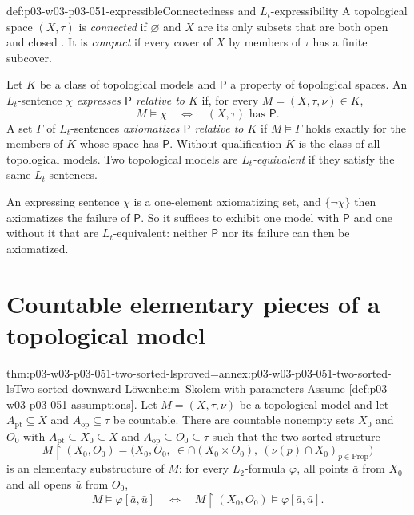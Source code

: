 \begin{hbdefinition}{def:p03-w03-p03-051-expressible}{Connectedness and \(L_t\)-expressibility}
A topological space \((X,\tau)\) is \emph{connected} if \(\varnothing\) and
\(X\) are its only subsets that are both open and closed
\cite[Definition~13, p.~11]{TenCateGabelaiaSustretov2006TopologyDraft}.
It is \emph{compact} if every cover of \(X\) by members of \(\tau\) has a
finite subcover.

Let \(K\) be a class of topological models and \(\mathsf P\) a property of
topological spaces. An \(L_t\)-sentence \(\chi\) \emph{expresses
\(\mathsf P\) relative to \(K\)} if, for every \(M=(X,\tau,\nu)\in K\),
\[
 M\models\chi\quad\Longleftrightarrow\quad(X,\tau)\text{ has }\mathsf P.
\]
A set \(\Gamma\) of \(L_t\)-sentences \emph{axiomatizes \(\mathsf P\)
relative to \(K\)} if \(M\models\Gamma\) holds exactly for the members of
\(K\) whose space has \(\mathsf P\). Without qualification \(K\) is the
class of all topological models. Two topological models are
\emph{\(L_t\)-equivalent} if they satisfy the same \(L_t\)-sentences.
\end{hbdefinition}

An expressing sentence \(\chi\) is a one-element axiomatizing set, and
\(\{\neg\chi\}\) then axiomatizes the failure of \(\mathsf P\). So it
suffices to exhibit one model with \(\mathsf P\) and one without it that are
\(L_t\)-equivalent: neither \(\mathsf P\) nor its failure can then be
axiomatized.

\section{Countable elementary pieces of a topological model}
\label{sec:p03-w03-p03-051-pieces}

\begin{hblemma}{thm:p03-w03-p03-051-two-sorted-ls}{proved=annex:p03-w03-p03-051-two-sorted-ls}{Two-sorted downward L\"owenheim--Skolem with parameters}
Assume \cref{def:p03-w03-p03-051-assumptions}. Let \(M=(X,\tau,\nu)\) be a
topological model and let \(A_{\mathrm{pt}}\subseteq X\) and
\(A_{\mathrm{op}}\subseteq\tau\) be countable. There are countable
nonempty sets \(X_0\) and \(O_0\) with
\(A_{\mathrm{pt}}\subseteq X_0\subseteq X\) and
\(A_{\mathrm{op}}\subseteq O_0\subseteq\tau\) such that the two-sorted
structure
\[
 M\restriction(X_0,O_0)=
 \bigl(X_0,O_0,\ \in\cap(X_0\times O_0),\ (\nu(p)\cap X_0)_{p\in\mathrm{Prop}}\bigr)
\]
is an elementary substructure of \(M\): for every \(L_2\)-formula
\(\varphi\), all points \(\bar a\) from \(X_0\) and all opens \(\bar u\)
from \(O_0\),
\[
 M\models\varphi[\bar a,\bar u]
 \quad\Longleftrightarrow\quad
 M\restriction(X_0,O_0)\models\varphi[\bar a,\bar u].
\]
\end{hblemma}

